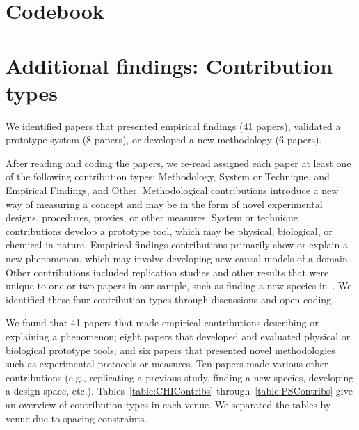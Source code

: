 
\clearpage
\section{Codebook}
\tableLitSurveyCodes
\clearpage

\section{Additional findings: Contribution types}
We identified papers that presented empirical findings (41 papers), validated a
prototype system (8 papers), or developed a new methodology (6 papers). 

After reading and coding the papers, we re-read assigned each paper at least one
of the following contribution types: Methodology, System or Technique, and
Empirical Findings, and Other. Methodological contributions introduce a new way
of measuring a concept and may be in the form of novel experimental designs,
procedures, proxies, or other measures. System or technique contributions
develop a prototype tool, which may be physical, biological, or chemical in
nature. Empirical findings contributions primarily show or explain a new
phenomenon, which may involve developing new causal models of a domain. Other
contributions included replication studies and other results that were unique to
one or two papers in our sample, such as finding a new species in~\cite{N1}. We
identified these four contribution types through discussions and open coding. 

We found that 41 papers that made empirical contributions describing or
explaining a phenomenon; eight papers that developed and evaluated physical or
biological prototype tools; and six papers that presented novel methodologies
such as experimental protocols or measures. Ten papers made various other
contributions (e.g., replicating a previous study, finding a new species,
developing a design space, etc.). Tables~\ref{table:CHIContribs}
through~\ref{table:PSContribs} give an overview of contribution types in each
venue. We separated the tables by venue due to spacing constraints. 


